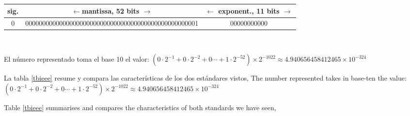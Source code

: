\begin{tabular}{|c||c||c|}
\hline
sig.&$\leftarrow$mantissa, 52 bits $\rightarrow$&$\leftarrow$ exponent., 11 bits $\rightarrow$\\
\hline
0&000000000000000000000000000000000000000000000000001&00000000000\\
\hline
\end{tabular}\\
\begin{paracol}{2}
El número representado toma el base 10 el valor: $(0\cdot2^{-1}+0\cdot2^{-2}+0\cdots+1\cdot2^{-52})\times2^{-1022}\approx  4.940656458412465\times10^{-324}$
 
La tabla \ref{tbieee} resume y compara las características de los dos estándares vistos,
\switchcolumn
The number represented takes in base-ten the value: $(0\cdot2^{-1}+0\cdot2^{-2}+0\cdots+1\cdot2^{-52})\times2^{-1022}\approx  4.940656458412465\times10^{-324}$

Table \ref{tbieee} summarises and compares the characteristics of both standards we have seen, 
\end{paracol}
